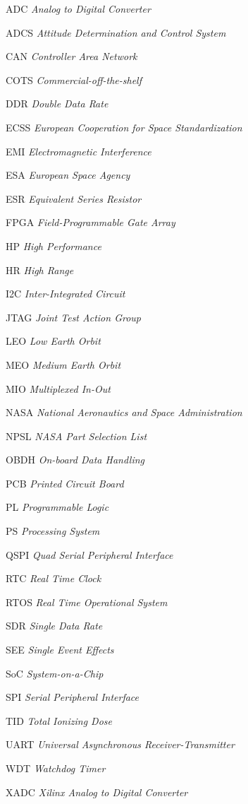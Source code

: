 \documentclass[
12pt,				%
oneside,			%
a4paper,			%
chapter=TITLE,		%
section=TITLE,		%
english,			%
brazil				%
hyperref=hidelinks]{abntex2}
\begin{document}
\imprimirlistafiguras


\imprimirlistatabelas

\begin{siglas}
	\item[ADC] \textit{Analog to Digital Converter}
	\item[ADCS] \textit{Attitude Determination and Control System}
	\item[CAN] \textit{Controller Area Network}
	\item[COTS] \textit{Commercial-off-the-shelf}
	\item[DDR] \textit{Double Data Rate}
	\item[ECSS] \textit{European Cooperation for Space Standardization}
	\item[EMI] \textit{Electromagnetic Interference}
	\item[ESA] \textit{European Space Agency}
	\item[ESR] \textit{Equivalent Series Resistor}
	\item[FPGA] \textit{Field-Programmable Gate Array}
	\item[HP] \textit{High Performance} 
	\item[HR] \textit{High Range}
	\item[I2C] \textit{Inter-Integrated Circuit}
	\item[JTAG] \textit{Joint Test Action Group}
	\item[LEO] \textit{Low Earth Orbit}
	\item[MEO] \textit{Medium Earth Orbit}
	\item[MIO] \textit{Multiplexed In-Out}
	\item[NASA] \textit{National Aeronautics and Space Administration}
	\item[NPSL] \textit{NASA Part Selection List}
	\item[OBDH] \textit{On-board Data Handling} 
	\item[PCB] \textit{Printed Circuit Board}
	\item[PL] \textit{Programmable Logic}
	\item[PS] \textit{Processing System}
	\item[QSPI] \textit{Quad Serial Peripheral Interface}
	\item[RTC] \textit{Real Time Clock}
	\item[RTOS] \textit{Real Time Operational System}
	\item[SDR] \textit{Single Data Rate}
	\item[SEE] \textit{Single Event Effects}
	\item[SoC] \textit{System-on-a-Chip}
	\item[SPI] \textit{Serial Peripheral Interface}
	\item[TID] \textit{Total Ionizing Dose}
	\item[UART] \textit{Universal Asynchronous Receiver-Transmitter}
	\item[WDT] \textit{Watchdog Timer}	
	\item[XADC] \textit{Xilinx Analog to Digital Converter}
\end{siglas}
\end{document}
